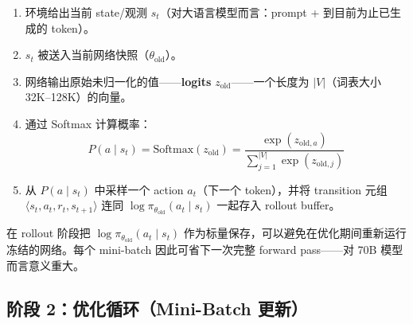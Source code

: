 \begin{enumerate}
  \item 环境给出当前 state/观测 $s_t$（对大语言模型而言：prompt + 到目前为止已生成的 token）。
  \item $s_t$ 被送入当前网络快照（$\theta_{\text{old}}$）。
  \item 网络输出原始未归一化的值——\textbf{logits} $z_{\text{old}}$——一个长度为 $|V|$（词表大小 32K--128K）的向量。
  \item 通过 Softmax 计算概率：
\begin{equation}
\boxed{P(a \mid s_t) = \text{Softmax}(z_{\text{old}}) = \frac{\exp(z_{\text{old}, a})}{\sum_{j=1}^{|V|} \exp(z_{\text{old}, j})}}
\end{equation}
  \item 从 $P(a \mid s_t)$ 中采样一个 action $a_t$（下一个 token），并将 transition 元组 $\langle s_t, a_t, r_t, s_{t+1} \rangle$ 连同 $\log \pi_{\theta_{\text{old}}}(a_t \mid s_t)$ 一起存入 rollout buffer。
\end{enumerate}

\begin{intuitionbox}[为何要存对数概率？]
在 rollout 阶段把 $\log \pi_{\theta_{\text{old}}}(a_t \mid s_t)$ 作为标量保存，可以避免在优化期间重新运行冻结的网络。每个 mini-batch 因此可省下一次完整 forward pass——对 70B 模型而言意义重大。
\end{intuitionbox}

\subsection{阶段 2：优化循环（Mini-Batch 更新）}
\label{phase-2-optimization-loop-mini-batch-updates}


